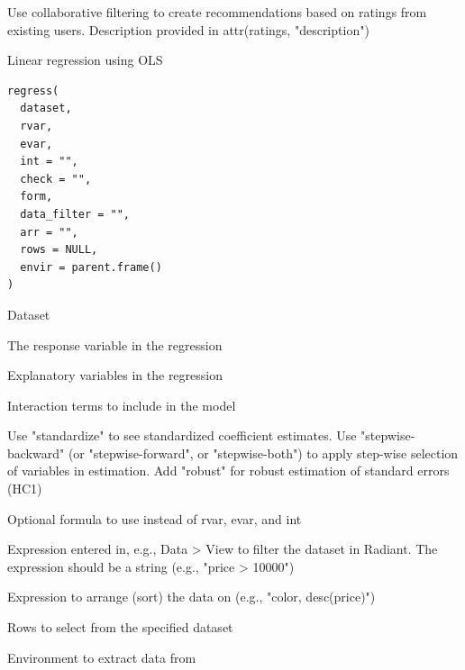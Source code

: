 \documentclass[a4paper]{book}
\begin{document}
%
\begin{Details}
Use collaborative filtering to create recommendations based on ratings from existing users. Description provided in attr(ratings, "description")
\end{Details}
%
\begin{Description}
Linear regression using OLS
\end{Description}
%
\begin{Usage}
\begin{verbatim}
regress(
  dataset,
  rvar,
  evar,
  int = "",
  check = "",
  form,
  data_filter = "",
  arr = "",
  rows = NULL,
  envir = parent.frame()
)
\end{verbatim}
\end{Usage}
%
\begin{Arguments}
\begin{ldescription}
\item[\code{dataset}] Dataset

\item[\code{rvar}] The response variable in the regression

\item[\code{evar}] Explanatory variables in the regression

\item[\code{int}] Interaction terms to include in the model

\item[\code{check}] Use "standardize" to see standardized coefficient estimates. Use "stepwise-backward" (or "stepwise-forward", or "stepwise-both") to apply step-wise selection of variables in estimation. Add "robust" for robust estimation of standard errors (HC1)

\item[\code{form}] Optional formula to use instead of rvar, evar, and int

\item[\code{data\_filter}] Expression entered in, e.g., Data > View to filter the dataset in Radiant. The expression should be a string (e.g., "price > 10000")

\item[\code{arr}] Expression to arrange (sort) the data on (e.g., "color, desc(price)")

\item[\code{rows}] Rows to select from the specified dataset

\item[\code{envir}] Environment to extract data from
\end{ldescription}
\end{Arguments}
\end{document}
